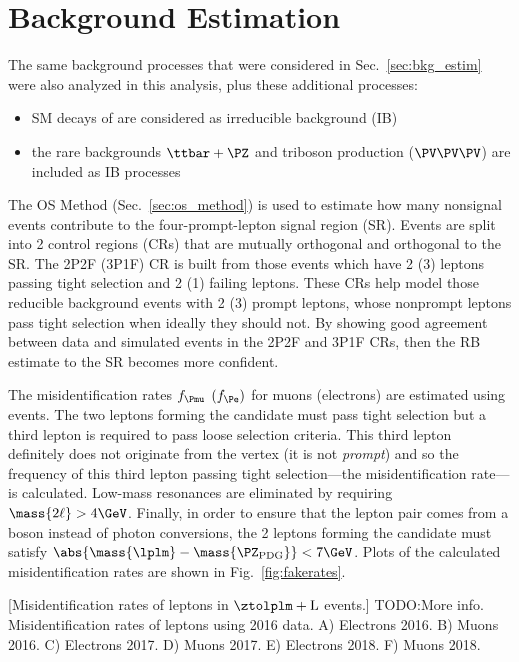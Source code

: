 \section{Background Estimation}
\label{sec:bkg_estim_dilep}
The same background processes that were considered in Sec.~\ref{sec:bkg_estim} were also analyzed in this analysis, plus these additional processes:
\begin{itemize}
    \item SM decays of \htofourl are considered as irreducible background (IB)
    \item the rare backgrounds $\ttbar + \PZ$ and triboson production ($\PV\PV\PV$) are included as IB processes
\end{itemize}

The OS Method (Sec.~\ref{sec:os_method}) is used to estimate how many nonsignal events contribute to the four-prompt-lepton signal region (SR).
Events are split into 2 control regions (CRs) that are mutually orthogonal and orthogonal to the SR.
The 2P2F (3P1F) CR is built from those events which have 2 (3) leptons passing tight selection and 2 (1) failing leptons.
These CRs help model those reducible background events with 2 (3) prompt leptons, whose nonprompt leptons pass tight selection when ideally they should not.
By showing good agreement between data and simulated events in the 2P2F and 3P1F CRs, then the RB estimate to the SR becomes more confident.

The misidentification rates $f_{\Pmu}$ $(f_{\Pe})$ for muons (electrons) are estimated using \ztolplm events.
The two leptons forming the \PZ candidate must pass tight selection but a third lepton is required to pass loose selection criteria.
This third lepton definitely does not originate from the \PZ vertex (\ie it is not \emph{prompt}) and so the frequency of this third lepton passing tight selection---the misidentification rate---is calculated.
Low-mass resonances are eliminated by requiring $\mass{2\ell} > 4\GeV$.
Finally, in order to ensure that the lepton pair comes from a \PZ boson instead of photon conversions, the 2 leptons forming the \PZ candidate must satisfy $\abs{\mass{\lplm} - \mass{\PZ_{\text{PDG}}}} < 7\GeV$.
Plots of the calculated misidentification rates are shown in Fig.~\ref{fig:fakerates}.
\begin{multiFigure}
        [Misidentification rates of leptons in $\ztolplm + \text{L}$ events.]
        {TODO:More info. Misidentification rates of leptons using 2016 data.
        A) Electrons 2016.
        B) Muons 2016.
        C) Electrons 2017.
        D) Muons 2017.
        E) Electrons 2018.
        F) Muons 2018.
        }
    \label{fig:fakerates}
\end{multiFigure}